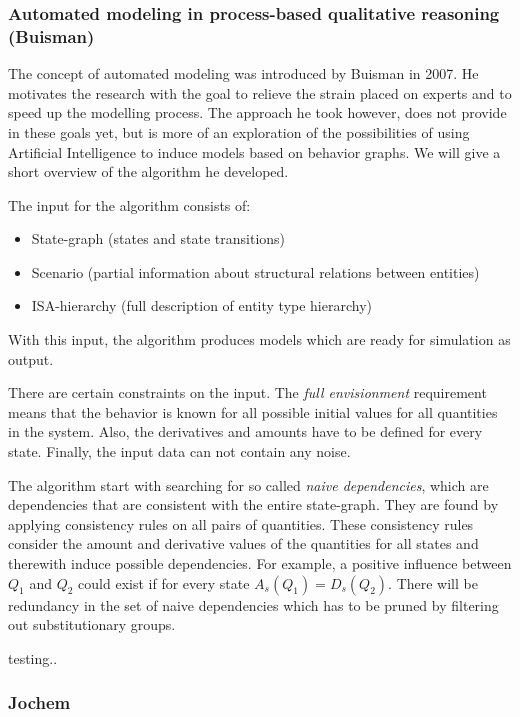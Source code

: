 \documentclass{article}
\begin{document}
\subsubsection{Automated modeling in process-based qualitative reasoning
(Buisman)}
The concept of automated modeling was introduced by Buisman \cite{buisman} in
2007. He motivates the research with the goal to relieve the strain placed on
experts and to speed up the modelling process. The approach he took however,
does not provide in these goals yet, but is more of an exploration of the
possibilities of using Artificial Intelligence to induce models based on
behavior graphs. We will give a short overview of the algorithm he developed.

The input for the algorithm consists of:
\begin{itemize}
\item State-graph (states and state transitions)
\item Scenario (partial information about structural relations between entities)
\item ISA-hierarchy (full description of entity type hierarchy)
\end{itemize}
With this input, the algorithm produces models which are ready for simulation as
output.

There are certain constraints on the input. The \emph{full envisionment}
requirement means that the behavior is known for all possible initial values for
all quantities in the system. Also, the derivatives and amounts have to be
defined for every state. Finally, the input data can not contain any noise.

The algorithm start with searching for so called \emph{naive dependencies},
which are dependencies that are consistent with the entire state-graph. They are
found by applying consistency rules on all pairs of quantities. These
consistency rules consider the amount and derivative values of the quantities
for all states and therewith induce possible dependencies. For example, a
 positive influence between $Q_1$ and $Q_2$ could exist if for every state 
 $A_s(Q_1) = D_s(Q_2)$.
There will be redundancy in the set of naive dependencies which has to be pruned
by filtering out substitutionary groups. %

testing.. 

\subsubsection{Jochem}
\end{document}

